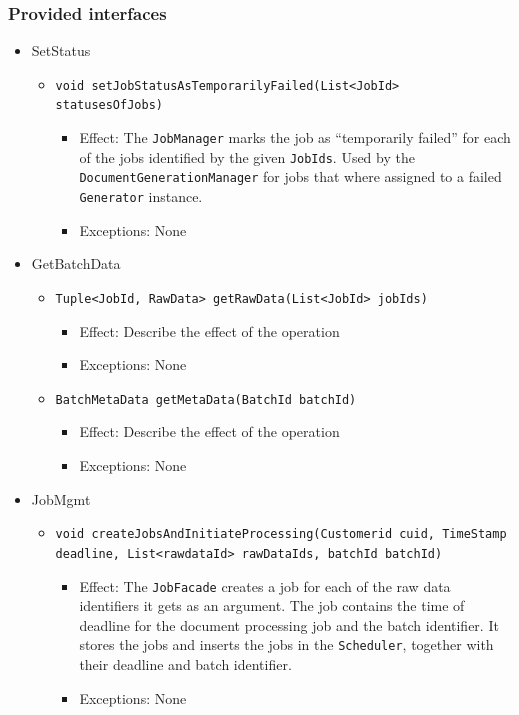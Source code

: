 \documentclass[a4paper,10pt]{article}
\begin{document}
\subsubsection*{Provided interfaces}
\begin{itemize}
    \item SetStatus
    \begin{itemize}
        \item \texttt{void setJobStatusAsTemporarilyFailed(List<JobId> statusesOfJobs)}
        \begin{itemize}
            \item Effect: The \texttt{JobManager} marks the job as ``temporarily failed'' for each of the jobs identified by the given \texttt{JobIds}. Used by the \texttt{DocumentGenerationManager} for jobs that where assigned to a failed \texttt{Generator} instance.
            \item Exceptions: None
        \end{itemize}
    \end{itemize}
    
	\item GetBatchData
    \begin{itemize}
        \item \texttt{Tuple<JobId, RawData> getRawData(List<JobId> jobIds)}
        \begin{itemize}
            \item Effect: Describe the effect of the operation
            \item Exceptions: None
        \end{itemize}
        \item \texttt{BatchMetaData getMetaData(BatchId batchId)}
        \begin{itemize}
            \item Effect: Describe the effect of the operation
            \item Exceptions: None
        \end{itemize}
    \end{itemize}  
    
    \item JobMgmt
    \begin{itemize}
    	\item \texttt{void createJobsAndInitiateProcessing(Customerid cuid, TimeStamp deadline, List<rawdataId> rawDataIds, batchId batchId)}
    	\begin{itemize}
            \item Effect: The \texttt{JobFacade} creates a job for each of the raw data identifiers it gets as an argument. The job contains the time of deadline for the document processing job and the batch identifier. It stores the jobs and inserts the jobs in the \texttt{Scheduler}, together with their deadline and batch identifier.
            \item Exceptions: None
        \end{itemize}
    	

\end{itemize}
\end{itemize}
\end{document}

